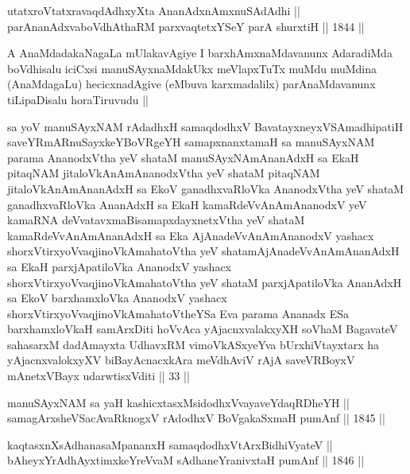 \begin{shl}
utatxroVtatxravaqdAdhxyX\s ta AnanAdxnAmxnuSAdAdhi || \\
parAnanAdxvaboVdhAthaRM parxvaqtetxYSeY parA shurxtiH ||  1844 ||  
\end{shl}


\begin{artha}
A AnaMdadakaNagaLa mUlakavAgiye I barxhAmxnaMdavanunx AdaradiMda
boVdhisalu iciCxsi manuSAyxnaMdakUkx meVlapxTuTx muMdu muMdina
(AnaMdagaLu) hecicxnadAgive (eMbuva karxmadalilx) parAnaMdavanunx
tiLipaDisalu horaTiruvudu || 
\end{artha}


\begin{shl}
sa yoV manuSAyxNAM rAdadhxH samaqdodhxV BavatayxneyxVSAmadhipatiH saveYRmARnuSayxkeYBoVRgeYH samapxnanxtamaH sa manuSAyxNAM parama AnanodxV\s tha yeV shataM manuSAyxNAmAnanAdxH sa EkaH pitaqNAM jitaloVkAnAmAnanodxV\s tha yeV shataM pitaqNAM jitaloVkAnAmAnanAdxH sa EkoV ganadhxvaRloVka AnanodxV\s tha yeV shataM ganadhxvaRloVka AnanAdxH sa EkaH kamaRdeVvAnAmAnanodxV yeV kamaRNA deVvatavxmaBisamapxdayxnetxV\s tha yeV shataM kamaRdeVvAnAmAnanAdxH sa Eka AjAnadeVvAnAmAnanodxV yashacx shorxVtirxyoV\s vaqjinoV\s kAmahatoV\s tha yeV shatamAjAnadeVvAnAmAnanAdxH sa EkaH parxjApatiloVka AnanodxV yashacx shorxVtirxyoV\s vaqjinoV\s kAmahatoV\s tha yeV shataM parxjApatiloVka AnanAdxH sa EkoV barxhamxloVka AnanodxV yashacx shorxVtirxyoV\s vaqjinoV\s kAmahatoV\s theYSa Eva parama Ananadx ESa barxhamxloVkaH samArxDiti hoVvAca yAjacnxvalakxyXH soVhaM BagavateV sahasarxM dadAmayxta UdhavxRM vimoVkASxyeYva bUrxhiVtayxtarx ha yAjacnxvalokxyXV biBayAcnacxkAra meVdhAviV rAjA saveVRBoyxV mAnetxVBayx udarwtisxVditi || 33 ||
\end{shl}


\begin{shl}
manuSAyxNAM sa yaH kashicxtasxMsidodhxV\s vayaveYdaqRDheYH || \\
samagArxsheVSacAvaRknogxV rAdodhxV BoVgakaSxmaH pumAnf ||  1845 ||  
\end{shl}

\begin{shl}
kaqtasxnXsAdhanasaMpananxH samaqdodhxV\s tArxBidhiVyateV || \\
bAheyxYrAdhAyxtimxkeYreVvaM sAdhaneYranivxtaH pumAnf ||  1846 ||  
\end{shl}

